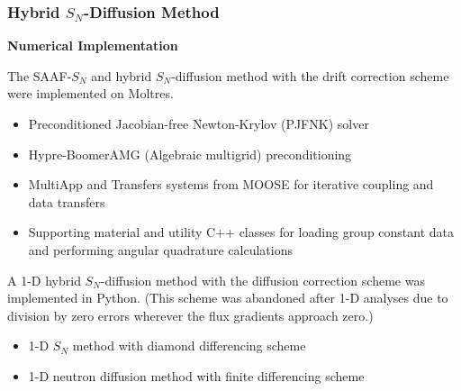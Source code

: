 \begin{frame}
  \frametitle{Hybrid $S_N$-Diffusion Method}
  \textbf{Numerical Implementation}
  \vspace{.2cm}

  The SAAF-$S_N$ and hybrid $S_N$-diffusion method with the drift correction scheme were
  implemented on Moltres.
  \begin{itemize}
    \item Preconditioned Jacobian-free Newton-Krylov (PJFNK) solver \cite{knoll_jacobian-free_2004}
    \item Hypre-BoomerAMG (Algebraic multigrid) preconditioning \cite{hypre_hypre_2022}
    \item MultiApp and Transfers systems from MOOSE for iterative coupling and data transfers
    \item Supporting material and utility C++ classes for loading group constant data and performing
      angular quadrature calculations
  \end{itemize}
  \vspace{.2cm}

  A 1-D hybrid $S_N$-diffusion method with the diffusion correction
  scheme was implemented in Python. (This scheme was abandoned after 1-D analyses due to division by
  zero errors wherever the flux gradients approach zero.)
  \begin{itemize}
    \item 1-D $S_N$ method with diamond differencing scheme
    \item 1-D neutron diffusion method with finite differencing scheme
  \end{itemize}
\end{frame}
